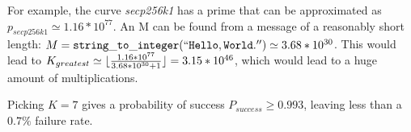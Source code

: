 For example, the curve \emph{secp256k1} has a prime that can be approximated as \(p_{secp256k1} \simeq 1.16*10^{77}\).\cite{safecurves} An M can be
found from a message of a reasonably short length: \(M = \mathtt{string\_to\_integer(``Hello, World.'')} \simeq 3.68*10^{30}\). This would lead to
\(K_{greatest} \simeq {\lfloor { {1.16*10^{77}} \over {3.68*10^{30} + 1}} \rfloor} = 3.15*10^{46}\), which would lead to a huge amount of multiplications.

Picking \(K = 7\) gives a probability of success \(P_{success} \geq 0.993\), leaving less than a \(0.7\%\) failure rate.